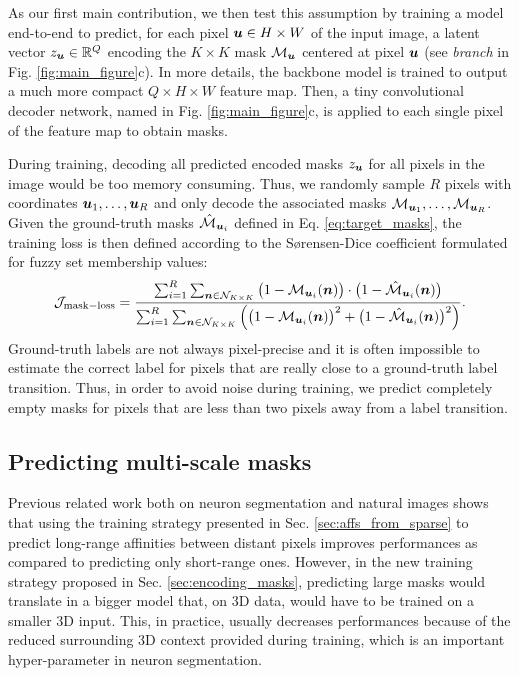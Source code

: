 As our first main contribution, we then test this assumption by training a model end-to-end to predict, for each pixel $\coord{u}\in H\times W$ of the input image, a latent vector $z_{\coord{u}}\in \mathbb{R}^Q$ encoding the $K \times K$ \maskname mask $\mathcal{M}_{\coord{u}}$ centered at pixel $\coord{u}$ (see \emph{\encBr branch} in Fig. \ref{fig:main_figure}c). 
In more details, the backbone model is trained to output a much more compact $Q\times H\times W$ feature map. 
Then, a tiny convolutional decoder network, named \emph{\maskDec} in Fig. \ref{fig:main_figure}c, is applied to each single pixel of the feature map to obtain masks.

During training, decoding all predicted encoded masks $z_{\coord{u}}$ for all pixels in the image would be too memory consuming. Thus, we randomly sample $R$ pixels with coordinates $\coord{u}_1, \ldots, \coord{u}_R$ and only decode the associated masks $\mathcal{M}_{\coord{u}_1}, \ldots, \mathcal{M}_{\coord{u}_R}$. 
Given the ground-truth \maskname masks $\hat{\mathcal{M}}_{\coord{u}_i}$ defined in Eq. \ref{eq:target_masks}, the training loss is then defined according to the S\o rensen-Dice coefficient formulated for fuzzy set membership values:
\begin{equation}
\mathcal{J}_{\mathrm{mask-loss}} = \frac{\sum_{i=1}^R \sum_{\coord{n} \in \mathcal{N}_{K\times K}} \big(1-\mathcal{M}_{\coord{u}_i}(\coord{n})\big)\cdot \big(1-\hat{\mathcal{M}}_{\coord{u}_i}(\coord{n})\big)}{\sum_{i=1}^R \sum_{\coord{n}\in \mathcal{N}_{K\times K}} \Big( \big(1-\mathcal{M}_{\coord{u}_i}(\coord{n})\big)^2 + \big(1-\hat{\mathcal{M}}_{\coord{u}_i}(\coord{n})\big)^2 \Big)}.
\end{equation} 
Ground-truth labels are not always pixel-precise and it is often impossible to estimate the correct label for pixels that are really close to a ground-truth label transition. Thus, in order to avoid noise during training, we predict completely empty masks for pixels that are less than two pixels away from a label transition. 


\subsection{Predicting multi-scale \maskname masks}\label{sec:multiscale_patches}
Previous related work both on neuron segmentation \cite{lee2017superhuman} and natural images \cite{liu2018affinity,Gao_2019_ICCV} shows that using the training strategy presented in Sec. \ref{sec:affs_from_sparse} to predict long-range affinities between distant pixels improves performances as compared to predicting only short-range ones. However, in the new training strategy proposed in Sec. \ref{sec:encoding_masks}, predicting large \maskname masks would translate in a bigger model that, on 3D data, would have to be trained on a smaller 3D input.
This, in practice, usually decreases performances because of the reduced surrounding 3D context provided during training, which is an important hyper-parameter in neuron segmentation.

